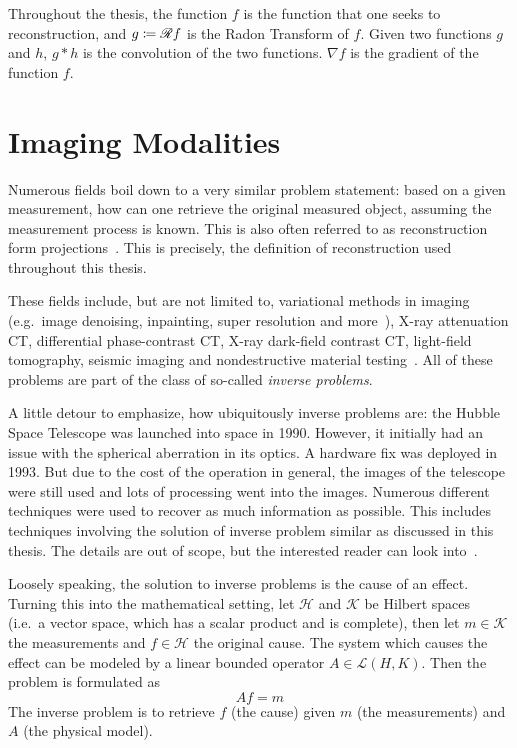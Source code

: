 Throughout the thesis, the function \(f\) is the function that one seeks to reconstruction, and
\(g \coloneq \mathscr{R} f\) is the Radon Transform of \(f\). Given two functions \(g\) and \(h\),
\(g \ast h\) is the convolution of the two functions. \(\nabla f\) is the gradient of the
function \(f\).

\chapter{Imaging Modalities}\label{chap:imaging_modalities}

Numerous fields boil down to a very similar problem statement: based on a given measurement, how can
one retrieve the original measured object, assuming the measurement process is known. This is also
often referred to as reconstruction form projections~\cite{herman_basis_2015}. This is precisely,
the definition of reconstruction used throughout this thesis.

These fields include, but are not limited to, variational methods in imaging (e.g.\ image denoising,
inpainting, super resolution and more~\cite{scherzer_variational_2009}), X-ray attenuation CT,
differential phase-contrast CT, X-ray dark-field contrast CT, light-field tomography, seismic
imaging and nondestructive material testing~\cite{carpio_inverse_2008}. All of these problems are
part of the class of so-called \textit{inverse problems}.

A little detour to emphasize, how ubiquitously inverse problems are: the Hubble Space Telescope was
launched into space in 1990. However, it initially had an issue with the spherical aberration in its
optics. A hardware fix was deployed in 1993. But due to the cost of the operation in general, the
images of the telescope were still used and lots of processing went into the images. Numerous
different techniques were used to recover as much information as possible. This includes techniques
involving the solution of inverse problem similar as discussed in this thesis. The details are out
of scope, but the interested reader can look into~\cite{white_restoration_1992,adorf_hubble_1995}.

\begin{definition}\label{def:inverse_problem}
	Loosely speaking, the solution to inverse problems is the cause of an effect. Turning this
	into the mathematical setting, let \(\mathcal{H}\) and \(\mathcal{K}\) be Hilbert spaces
	(i.e.\ a vector space, which has a scalar product and is complete), then let \(m \in
	\mathcal{K}\) the measurements and \(f \in \mathcal{H}\) the original cause. The system
	which causes the effect can be modeled by a linear bounded operator \(A \in \mathscr{L}(H,
	K)\). Then the problem is formulated as
	\[ A f = m \]
	The inverse problem is to retrieve \(f\) (the cause) given \(m\) (the measurements) and \(A\)
	(the physical model).
\end{definition}

